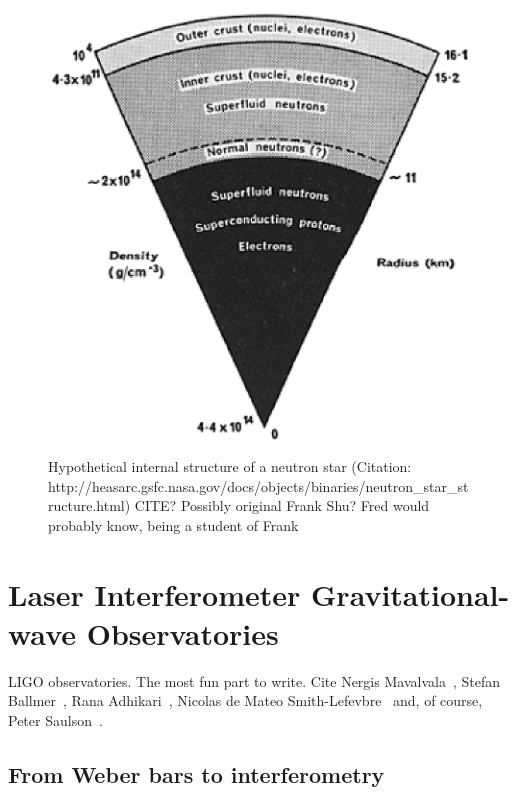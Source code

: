 	\begin{figure}
	\begin{center}
	\includegraphics[height=120mm, width=160mm]{neutron_star_structure.eps}
	\caption{Hypothetical internal structure of a neutron star (Citation: http://heasarc.gsfc.nasa.gov/docs/objects/binaries/neutron\_star\_structure.html) CITE? Possibly original Frank Shu? Fred would probably know, being a student of Frank}
	\label{neutron_star_structure}
	\end{center}
	\end{figure}


    \section{Laser Interferometer Gravitational-wave Observatories}
    \label{LIGO}
        
        LIGO observatories. The most fun part to write. Cite Nergis Mavalvala~\cite{MavalvalaThesis}, Stefan Ballmer~\cite{BallmerThesis}, Rana Adhikari~\cite{AdhikariThesis}, Nicolas de Mateo Smith-Lefevbre~\cite{SmithThesis} and, of course, Peter Saulson~\cite{Saulson}.

        \subsection{From Weber bars to interferometry}
        \label{bars_to_interferometry}

